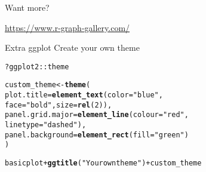 \documentclass[10pt]{beamer}\usepackage[]{graphicx}\usepackage[]{color}
\makeatletter
\newcommand{\hlnum}[1]{\textcolor[rgb]{0.686,0.059,0.569}{#1}}%
\newcommand{\hlstr}[1]{\textcolor[rgb]{0.192,0.494,0.8}{#1}}%
\newcommand{\hlopt}[1]{\textcolor[rgb]{0,0,0}{#1}}%
\newcommand{\hlstd}[1]{\textcolor[rgb]{0.345,0.345,0.345}{#1}}%
\newcommand{\hlkwb}[1]{\textcolor[rgb]{0.69,0.353,0.396}{#1}}%
\newcommand{\hlkwc}[1]{\textcolor[rgb]{0.333,0.667,0.333}{#1}}%
\newcommand{\hlkwd}[1]{\textcolor[rgb]{0.737,0.353,0.396}{\textbf{#1}}}%
\newenvironment{kframe}{%
 \def\at@end@of@kframe{}%
 \ifinner\ifhmode%
  \def\at@end@of@kframe{\end{minipage}}%
  \begin{minipage}{\columnwidth}%
 \fi\fi%
 \def\FrameCommand##1{\hskip\@totalleftmargin \hskip-\fboxsep
 \colorbox{shadecolor}{##1}\hskip-\fboxsep
     \hskip-\linewidth \hskip-\@totalleftmargin \hskip\columnwidth}%
 \MakeFramed {\advance\hsize-\width
   \@totalleftmargin\z@ \linewidth\hsize
   \@setminipage}}%
 {\par\unskip\endMakeFramed%
 \at@end@of@kframe}
\newenvironment{knitrout}{}{} %
\makeatother
\begin{document}
\begin{frame}{Want more?}

\url{https://www.r-graph-gallery.com/}

\end{frame}


\begin{frame}[fragile]{Extra ggplot}
Create your own theme

\begin{knitrout}
\color{fgcolor}\begin{kframe}
\begin{alltt}
\hlopt{?}\hlstd{ggplot2}\hlopt{::}\hlstd{theme}

\hlstd{custom_theme} \hlkwb{<-} \hlkwd{theme}\hlstd{(}
\hlkwc{plot.title} \hlstd{=} \hlkwd{element_text}\hlstd{(}\hlkwc{color} \hlstd{=} \hlstr{"blue"}\hlstd{,}
\hlkwc{face} \hlstd{=} \hlstr{"bold"}\hlstd{,} \hlkwc{size}\hlstd{=}\hlkwd{rel}\hlstd{(}\hlnum{2}\hlstd{)),}
\hlkwc{panel.grid.major} \hlstd{=} \hlkwd{element_line}\hlstd{(}\hlkwc{colour}\hlstd{=}\hlstr{"red"}\hlstd{,}
\hlkwc{linetype} \hlstd{=} \hlstr{"dashed"}\hlstd{),}
\hlkwc{panel.background} \hlstd{=} \hlkwd{element_rect}\hlstd{(}\hlkwc{fill} \hlstd{=} \hlstr{"green"}\hlstd{)}
\hlstd{)}

\hlstd{basicplot} \hlopt{+} \hlkwd{ggtitle}\hlstd{(}\hlstr{"Your own theme"}\hlstd{)} \hlopt{+} \hlstd{custom_theme}
\end{alltt}
\end{kframe}
\end{knitrout}
\end{frame}
\end{document}
